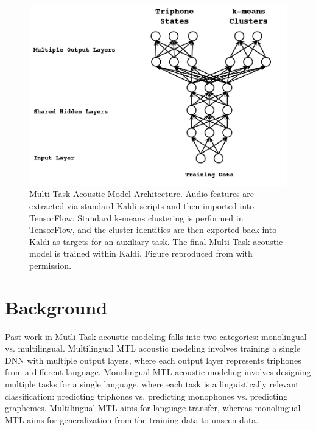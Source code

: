 \documentclass[a4paper]{article}
\begin{document}
\begin{figure}[!htbp]
  \centering
{}
  \includegraphics[width=\linewidth]{figs/heigold-2013-dnn-c.png}
  \caption{Multi-Task Acoustic Model Architecture. Audio features are extracted via standard Kaldi scripts and then imported into TensorFlow. Standard k-means clustering is performed in TensorFlow, and the cluster identities are then exported back into Kaldi as targets for an auxiliary task. The final Multi-Task acoustic model is trained within Kaldi. Figure reproduced from \cite{heigold2013} with permission.}
    \label{fig:mtl-dnn}
  \endminipage\hfill
\end{figure}


\section{Background}

Past work in Mutli-Task acoustic modeling falls into two categories: monolingual vs. multilingual. Multilingual MTL acoustic modeling involves training a single DNN with multiple output layers, where each output layer represents triphones from a different language. \cite{huang2013, heigold2013, tuske2014multilingual, grezl2016} Monolingual MTL acoustic modeling involves designing multiple tasks for a single language, where each task is a linguistically relevant classification: predicting triphones vs. predicting monophones vs. predicting graphemes. Multilingual MTL aims for language transfer, whereas monolingual MTL aims for generalization from the training data to unseen data.

\end{document}
